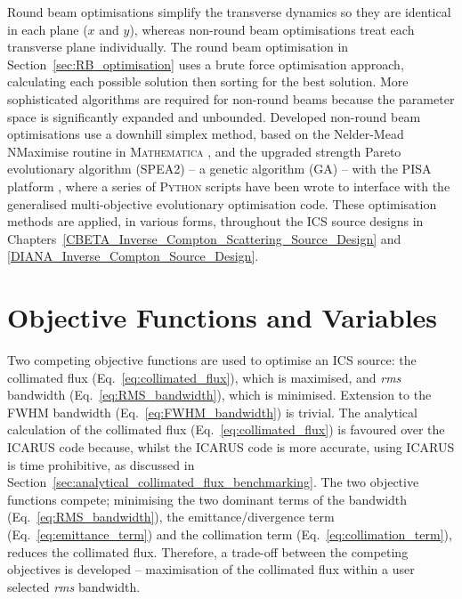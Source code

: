 \documentclass[../main.tex]{subfiles}
\begin{document}
Round beam optimisations simplify the transverse dynamics so they are identical in each plane ($x$ and $y$), whereas non-round beam optimisations treat each transverse plane individually. The round beam optimisation in Section~\ref{sec:RB_optimisation} uses a brute force optimisation approach, calculating each possible solution then sorting for the best solution. More sophisticated algorithms are required for non-round beams because the parameter space is significantly expanded and unbounded. Developed non-round beam optimisations use a downhill simplex method, based on the Nelder-Mead NMaximise routine in \textsc{Mathematica} \cite{wolfram2021nmaximize}, and the upgraded strength Pareto evolutionary algorithm (\textsc{SPEA2}) \cite{zitzler2001spea2} -- a genetic algorithm (GA) -- with the \textsc{PISA} platform \cite{bleuler2003pisa}, where a series of \textsc{Python} scripts have been wrote to interface with the generalised multi-objective evolutionary optimisation code. These optimisation methods are applied, in various forms, throughout the ICS source designs in Chapters~\ref{CBETA_Inverse_Compton_Scattering_Source_Design} and \ref{DIANA_Inverse_Compton_Source_Design}.    

\section{Objective Functions and Variables}
\label{sec:objective_functions_and_variables}

Two competing objective functions are used to optimise an ICS source: the collimated flux (Eq.~\ref{eq:collimated_flux}), which is maximised, and \textit{rms} bandwidth (Eq.~\ref{eq:RMS_bandwidth}), which is minimised. Extension to the FWHM bandwidth (Eq.~\ref{eq:FWHM_bandwidth}) is trivial. The analytical calculation of the collimated flux (Eq.~\ref{eq:collimated_flux}) is favoured over the \textsc{ICARUS} code because, whilst the \textsc{ICARUS} code is more accurate, using \textsc{ICARUS} is time prohibitive, as discussed in Section~\ref{sec:analytical_collimated_flux_benchmarking}. The two objective functions compete; minimising the two dominant terms of the  bandwidth (Eq.~\ref{eq:RMS_bandwidth}), the emittance/divergence term (Eq.~\ref{eq:emittance_term}) and the collimation term (Eq.~\ref{eq:collimation_term}), reduces the collimated flux. Therefore, a trade-off between the competing objectives is developed -- maximisation of the collimated flux within a user selected \textit{rms} bandwidth. 
\end{document}
